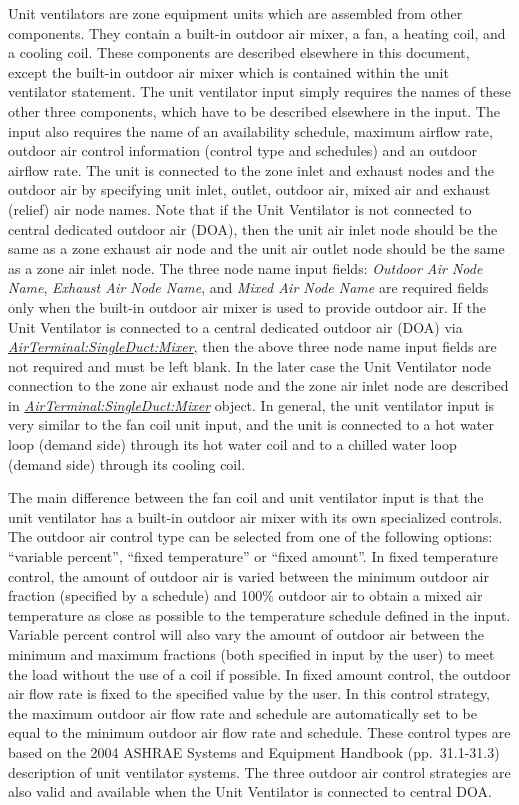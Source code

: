 Unit ventilators are zone equipment units which are assembled from other components. They contain a built-in outdoor air mixer, a fan, a heating coil, and a cooling coil. These components are described elsewhere in this document, except the built-in outdoor air mixer which is contained within the unit ventilator statement. The unit ventilator input simply requires the names of these other three components, which have to be described elsewhere in the input. The input also requires the name of an availability schedule, maximum airflow rate, outdoor air control information (control type and schedules) and an outdoor airflow rate. The unit is connected to the zone inlet and exhaust nodes and the outdoor air by specifying unit inlet, outlet, outdoor air, mixed air and exhaust (relief) air node names. Note that if the Unit Ventilator is not connected to central dedicated outdoor air (DOA), then the unit air inlet node should be the same as a zone exhaust air node and the unit air outlet node should be the same as a zone air inlet node. The three node name input fields: \textit{Outdoor Air Node Name}, \textit{Exhaust Air Node Name}, and \textit{Mixed Air Node Name} are required fields only when the built-in outdoor air mixer is used to provide outdoor air. If the Unit Ventilator is connected to a central dedicated outdoor air (DOA) via \textit{\hyperref[airterminalsingleductmixer]{AirTerminal:SingleDuct:Mixer}}, then the above three node name input fields are not required and must be left blank. In the later case the Unit Ventilator node connection to the zone air exhaust node and the zone air inlet node are described in \textit{\hyperref[airterminalsingleductmixer]{AirTerminal:SingleDuct:Mixer}} object. In general, the unit ventilator input is very similar to the fan coil unit input, and the unit is connected to a hot water loop (demand side) through its hot water coil and to a chilled water loop (demand side) through its cooling coil.

The main difference between the fan coil and unit ventilator input is that the unit ventilator has a built-in outdoor air mixer with its own specialized controls. The outdoor air control type can be selected from one of the following options: ``variable percent'', ``fixed temperature'' or ``fixed amount''. In fixed temperature control, the amount of outdoor air is varied between the minimum outdoor air fraction (specified by a schedule) and 100\% outdoor air to obtain a mixed air temperature as close as possible to the temperature schedule defined in the input. Variable percent control will also vary the amount of outdoor air between the minimum and maximum fractions (both specified in input by the user) to meet the load without the use of a coil if possible. In fixed amount control, the outdoor air flow rate is fixed to the specified value by the user. In this control strategy, the maximum outdoor air flow rate and schedule are automatically set to be equal to the minimum outdoor air flow rate and schedule. These control types are based on the 2004 ASHRAE Systems and Equipment Handbook (pp.~31.1-31.3) description of unit ventilator systems. The three outdoor air control strategies are also valid and available when the Unit Ventilator is connected to central DOA.


